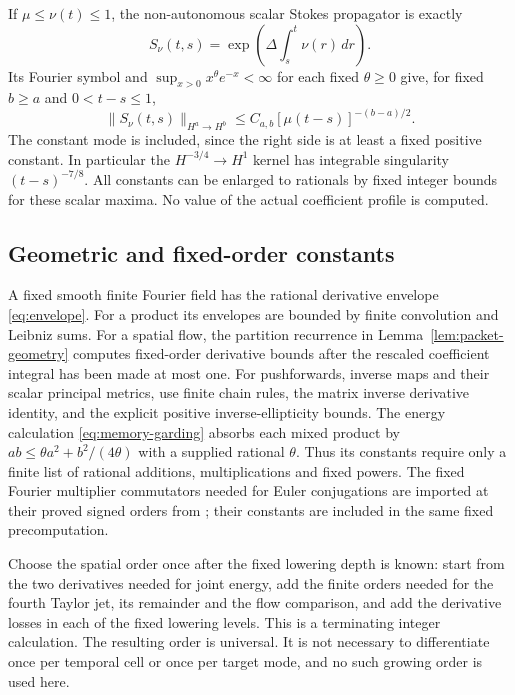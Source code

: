 \documentclass[11pt,a4paper]{amsart}
\theoremstyle{definition}
\theoremstyle{remark}
\numberwithin{equation}{section}
\newcommand{\norm}[1]{\lVert #1\rVert}
\begin{document}
If $\mu\le\nu(t)\le1$, the non-autonomous scalar Stokes propagator is
exactly
\[
 S_\nu(t,s)=\exp\left(\Delta\int_s^t\nu(r)\,dr\right).
\]
Its Fourier symbol and $\sup_{x>0}x^\theta e^{-x}<\infty$ for each fixed
$\theta\ge0$ give, for fixed
$b\ge a$ and $0<t-s\le1$,
\begin{equation}\label{eq:heat-smoothing}
 \norm{S_\nu(t,s)}_{H^a\to H^b}
       \le C_{a,b}[\mu(t-s)]^{-(b-a)/2}.
\end{equation}
The constant mode is included, since the right side is at least a fixed
positive constant. In particular the $H^{-3/4}\to H^1$ kernel has
integrable singularity $(t-s)^{-7/8}$. All constants can be enlarged to
rationals by fixed integer bounds for these scalar maxima. No value of
the actual coefficient profile is computed.

\subsection{Geometric and fixed-order constants}
A fixed smooth finite Fourier field has the rational derivative envelope
\eqref{eq:envelope}. For a product its envelopes are bounded by finite
convolution and Leibniz sums. For a spatial flow, the partition recurrence
in Lemma~\ref{lem:packet-geometry} computes fixed-order derivative bounds
after the rescaled coefficient integral has been made at most one.
For pushforwards, inverse maps and their scalar principal metrics, use
finite chain rules, the matrix inverse derivative identity, and the explicit
positive inverse-ellipticity bounds. The energy calculation
\eqref{eq:memory-garding} absorbs each mixed product by
$ab\le\theta a^2+b^2/(4\theta)$ with a supplied rational $\theta$.
Thus its constants require only a finite list of rational additions,
multiplications and fixed powers. The fixed Fourier multiplier commutators
needed for Euler conjugations are imported at their proved signed orders
from \cite[Lemma~8.2]{Common}; their constants are included in the same
fixed precomputation.

Choose the spatial order once after the fixed lowering depth is known:
start from the two derivatives needed for joint energy, add the finite
orders needed for the fourth Taylor jet, its remainder and the flow
comparison, and add the derivative losses in each of the fixed lowering
levels. This is a terminating integer calculation. The resulting order
is universal. It is not necessary to differentiate once per temporal cell
or once per target mode, and no such growing order is used here.
\end{document}
